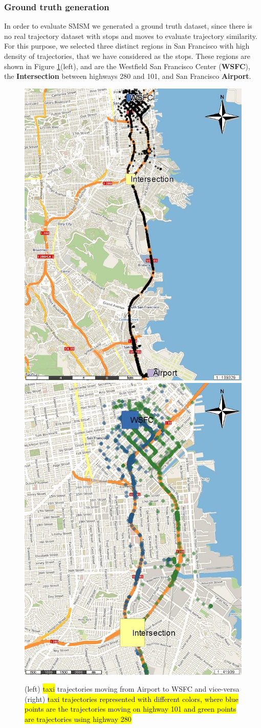 \documentclass[12pt]{article}
\begin{document}
\subsubsection{Ground truth generation}
In order to evaluate SMSM we generated a ground truth dataset, since there is no real trajectory dataset with stops and moves to evaluate trajectory similarity. For this purpose, we selected three distinct regions in San Francisco with high density of trajectories, that we have considered as the stops. These regions are shown in Figure \ref{fig:sanfrancisco_map_rois}(left), and are the Westfield San Francisco Center (\textbf{WSFC}), the \textbf{Intersection} between highways 280 and 101, and San Francisco \textbf{Airport}. 

\begin{figure}[ht!]
\centering
\includegraphics[width=.49\textwidth]{Images/CRAWDAD-Trajectories-Painted}
\includegraphics[width=.49\textwidth]{Images/CRAWDAD-Paths-Painted}
\caption{(left) \hl{taxi} trajectories moving from Airport to WSFC and vice-versa (right) \hl{taxi trajectories represented with different colors, where blue points are the trajectories moving on highway 101 and green points are trajectories using highway 280}}
\label{fig:sanfrancisco_map_rois}
\end{figure}
\end{document}
